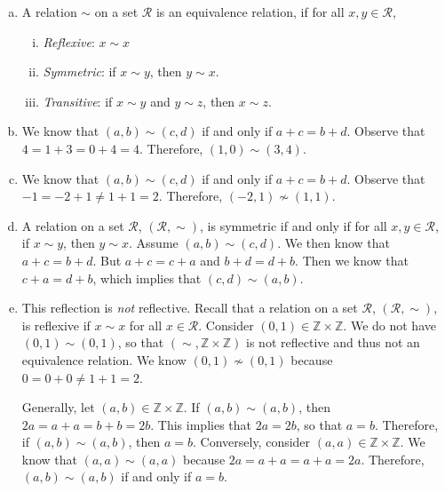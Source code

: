 \documentclass[11pt,letterpaper]{article}
\begin{document}
\sol 
\begin{enumerate}[(a)]
\item A relation $\sim$ on a set $\mathcal{R}$ is an equivalence relation, if for all $x, y \in \mathcal{R}$,
	\begin{enumerate}[(i)]
	\item {\itshape Reflexive}: $x \sim x$
	\item {\itshape Symmetric}: if $x \sim y$, then $y \sim x$. 
	\item {\itshape Transitive}: if $x \sim y$ and $y \sim z$, then $x \sim z$. 
	\end{enumerate} \pspace

\item We know that $(a, b) \sim (c, d)$ if and only if $a + c= b + d$. Observe that $4= 1 + 3= 0 + 4= 4$. Therefore, $(1, 0) \sim (3, 4)$. \pspace

\item We know that $(a, b) \sim (c, d)$ if and only if $a + c= b + d$. Observe that $-1= -2 + 1 \neq 1 + 1= 2$. Therefore, $(-2, 1) \not\sim (1, 1)$. \pspace 

\item A relation on a set $\mathcal{R}$, $(\mathcal{R}, \sim)$, is symmetric if and only if for all $x, y \in \mathcal{R}$, if $x \sim y$, then $y \sim x$. Assume $(a, b) \sim (c, d)$. We then know that $a + c= b + d$. But $a + c= c + a$ and $b + d= d + b$. Then we know that $c + a= d + b$, which implies that $(c, d) \sim (a, b)$. \pspace

\item This reflection is \textit{not} reflective. Recall that a relation on a set $\mathcal{R}$, $(\mathcal{R}, \sim)$, is reflexive if $x \sim x$ for all $x \in \mathcal{R}$. Consider $(0, 1) \in \mathbb{Z} \times \mathbb{Z}$. We do not have $(0, 1) \sim (0, 1)$, so that $(\sim, \mathbb{Z} \times \mathbb{Z})$ is not reflective and thus not an equivalence relation. We know $(0, 1) \not\sim (0, 1)$ because $0= 0 + 0 \neq 1 + 1= 2$. 

Generally, let $(a, b) \in \mathbb{Z} \times \mathbb{Z}$. If $(a, b) \sim (a, b)$, then $2a= a + a= b + b= 2b$. This implies that $2a= 2b$, so that $a= b$. Therefore, if $(a, b) \sim (a, b)$, then $a= b$. Conversely, consider $(a, a) \in \mathbb{Z} \times \mathbb{Z}$. We know that $(a, a) \sim (a, a)$ because $2a= a + a= a + a= 2a$. Therefore, $(a, b) \sim (a, b)$ if and only if $a= b$. 
\end{enumerate}
\end{document}
